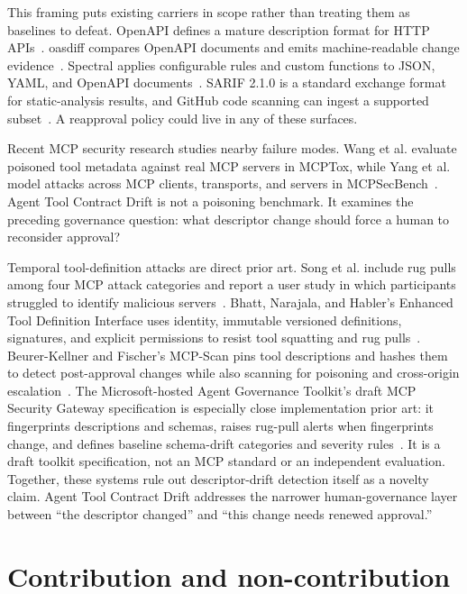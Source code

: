 \documentclass[11pt,letterpaper]{article}
\newcommand{\project}{Agent Tool Contract Drift}
\newcommand{\sarif}{SARIF}
\begin{document}
This framing puts existing carriers in scope rather than treating them as baselines to defeat. OpenAPI defines a mature description format for HTTP APIs~\cite{openapi-32}. oasdiff compares OpenAPI documents and emits machine-readable change evidence~\cite{oasdiff}. Spectral applies configurable rules and custom functions to JSON, YAML, and OpenAPI documents~\cite{spectral}. \sarif{} 2.1.0 is a standard exchange format for static-analysis results, and GitHub code scanning can ingest a supported subset~\cite{sarif-oasis,github-sarif}. A reapproval policy could live in any of these surfaces.

Recent MCP security research studies nearby failure modes. Wang et al. evaluate poisoned tool metadata against real MCP servers in MCPTox, while Yang et al. model attacks across MCP clients, transports, and servers in MCPSecBench~\cite{mcptox,mcpsecbench}. \project{} is not a poisoning benchmark. It examines the preceding governance question: what descriptor change should force a human to reconsider approval?

Temporal tool-definition attacks are direct prior art. Song et al. include rug pulls among four MCP attack categories and report a user study in which participants struggled to identify malicious servers~\cite{song-beyond-protocol}. Bhatt, Narajala, and Habler's Enhanced Tool Definition Interface uses identity, immutable versioned definitions, signatures, and explicit permissions to resist tool squatting and rug pulls~\cite{etdi}. Beurer-Kellner and Fischer's MCP-Scan pins tool descriptions and hashes them to detect post-approval changes while also scanning for poisoning and cross-origin escalation~\cite{mcp-scan}. The Microsoft-hosted Agent Governance Toolkit's draft MCP Security Gateway specification is especially close implementation prior art: it fingerprints descriptions and schemas, raises rug-pull alerts when fingerprints change, and defines baseline schema-drift categories and severity rules~\cite{microsoft-mcp-security-gateway}. It is a draft toolkit specification, not an MCP standard or an independent evaluation. Together, these systems rule out descriptor-drift detection itself as a novelty claim. \project{} addresses the narrower human-governance layer between ``the descriptor changed'' and ``this change needs renewed approval.''

\section{Contribution and non-contribution}
\end{document}
